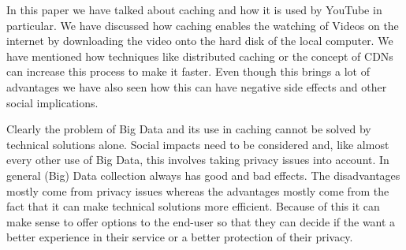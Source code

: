 In this paper we have talked about caching and how it is used by YouTube in particular. We have discussed how caching enables the watching of Videos on the internet by downloading the video onto the hard disk of the local computer. We have mentioned how techniques like distributed caching or the concept of CDNs can increase this process to make it faster. Even though this brings a lot of advantages we have also seen how this can have negative side effects and other social implications. 

Clearly the problem of Big Data and its use in caching cannot be solved by technical solutions alone. Social impacts need to be considered and, like almost every other use of Big Data, this involves taking privacy issues into account. In general (Big) Data collection always has good and bad effects. The disadvantages mostly come from privacy issues whereas the advantages mostly come from the fact that it can make technical solutions more efficient. Because of this it can make sense to offer options to the end-user so that they can decide if the want a better experience in their service or a better protection of their privacy. 
